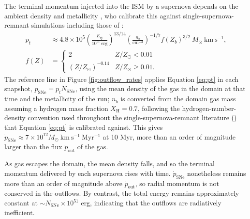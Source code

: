 \documentclass[twocolumn,linenumbers]{aastex631}
\begin{document}
The terminal momentum injected into the ISM by a supernova depends on the ambient density and metallicity \citep{2018MNRAS.480..800H}, who calibrate this against single-supernova-remnant simulations including those of \citet{1988ApJ...334..252C}:
\begin{align}
p_t &\approx 4.8\times 10^5 \left(\frac{E_\mathrm{ej}}{10^{51}\ \mathrm{erg}}\right)^{13/14}\left(\frac{n_b}{\mathrm{cm^{-3}}}\right)^{-1/7} f(Z_b)^{3/2}\ M_\odot\ \mathrm{km\ s^{-1}}, \label{eq:pt}\\
f(Z) &= \begin{cases} 2 & Z/Z_\odot < 0.01 \\ (Z/Z_\odot)^{-0.14} & Z/Z_\odot \geq 0.01. \end{cases} \label{eq:fZ}
\end{align}
The reference line in Figure \ref{fig:outflow_rates} applies Equation \ref{eq:pt} in each snapshot, $\dot{p}_\mathrm{SNe} = p_t \dot{N}_\mathrm{SNe}$, using the mean density of the gas in the domain at that time and the metallicity of the run; $n_b$ is converted from the domain gas mass assuming a hydrogen mass fraction $X_\mathrm{H} = 0.7$, following the hydrogen-number-density convention used throughout the single-supernova-remnant literature (\citealt{1988ApJ...334..252C,1998ApJ...500...95T,2015ApJ...802...99K,2015MNRAS.450..504M}) that Equation \ref{eq:pt} is calibrated against. This gives $\dot{p}_\mathrm{SNe} \approx 7\times 10^{12} M_\odot\ \mathrm{km\ s^{-1}\ Myr^{-1}}$ at 10 Myr, more than an order of magnitude larger than the flux $\dot{p}_\mathrm{out}$ of the gas.

As gas escapes the domain, the mean density falls, and so the terminal momentum delivered by each supernova rises with time. $\dot{p}_\mathrm{SNe}$ nonetheless remains more than an order of magnitude above $\dot{p}_\mathrm{out}$, so radial momentum is not conserved in the outflows. By contrast, the total energy remains approximately constant at $\sim N_\mathrm{SNe} \times 10^\mathrm{51}$ erg, indicating that the outflows are radiatively inefficient.
\end{document}
